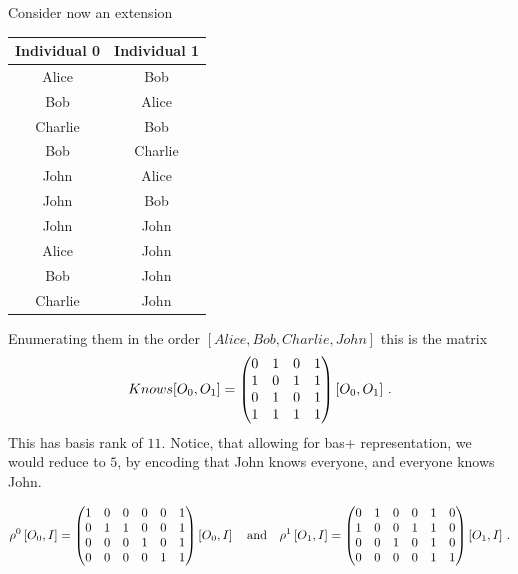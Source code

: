 \begin{example}
    Consider now an extension
    \begin{center}
        \begin{tabular}{c|c}
            \textbf{Individual 0} & \textbf{Individual 1} \\
            \hline
            Alice                 & Bob                   \\
            Bob                   & Alice                 \\
            Charlie               & Bob                   \\
            Bob                   & Charlie               \\
            John                  & Alice                 \\
            John                  & Bob                   \\
            John                  & John                  \\
            Alice                 & John                  \\
            Bob                   & John                  \\
            Charlie               & John                  \\
        \end{tabular}
    \end{center}
    Enumerating them in the order $[Alice,Bob,Charlie,John]$ this is the matrix
    \begin{align*}
        Knows[O_{0},O_{1}] =
        \begin{pmatrix} 
            0 & 1 & 0 & 1\\
            1 & 0 & 1 & 1\\
            0 & 1 & 0 & 1\\
            1 & 1 & 1 & 1
         \end{pmatrix}\left[O_{0},O_{1}\right] \, .
    \end{align*}
    This has basis rank of $11$.
    Notice, that allowing for bas+ representation, we would reduce to $5$, by encoding that John knows everyone, and everyone knows John.

    \begin{align*}
        \rho^{0}\left[O_{0},I\right]
        = \begin{pmatrix} 
            1 & 0 & 0 & 0 & 0 & 1\\
            0 & 1 & 1 & 0 & 0 & 1\\
            0 & 0 & 0 & 1 & 0 & 1\\
            0 & 0 & 0 & 0 & 1 & 1
         \end{pmatrix}\left[O_{0},I\right]
        \quad \text{and} \quad
        \rho^{1}\left[O_{1},I\right]
        = \begin{pmatrix} 
            0 & 1 & 0 & 0 & 1 & 0\\
            1 & 0 & 0 & 1 & 1 & 0\\
            0 & 0 & 1 & 0 & 1 & 0\\
            0 & 0 & 0 & 0 & 1 & 1\\
         \end{pmatrix}\left[O_{1},I\right] \, .
    \end{align*}
\end{example}